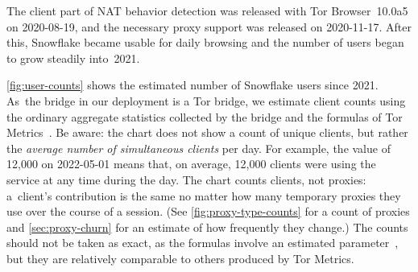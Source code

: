 \documentclass[letterpaper,twocolumn]{article}
\begin{document}
The client part of NAT behavior detection
was released with Tor Browser~10.0a5 on \mbox{2020-08-19},
and the necessary proxy support was released on \mbox{2020-11-17}.
After this, Snowflake became usable for daily browsing
and the number of users began to grow steadily into~2021.

\autoref{fig:user-counts}
shows the estimated number of Snowflake users since 2021.
As~the bridge in our deployment is a Tor bridge,
we estimate client counts using the ordinary aggregate statistics
collected by the bridge
and the formulas of Tor Metrics~\cite{tor-tr-2012-10-001}.
Be aware: the chart does not show a count of unique clients,
but rather the \emph{average number of simultaneous clients} per day.
For example, the value of 12,000 on \mbox{2022-05-01}
means that, on average, 12,000 clients were using the service
at any time during the day.
The chart counts clients, not proxies:
a~client's contribution is the same no matter how many
temporary proxies they use over the course of a session.
(See \autoref{fig:proxy-type-counts} for a count of proxies
and \autoref{sec:proxy-churn} for an estimate of how frequently they change.)
The counts should not be taken as exact,
as the formulas involve an estimated parameter~\cite[\S 4]{tor-tr-2012-10-001},
but they are relatively comparable to others
produced by Tor Metrics.
\end{document}
